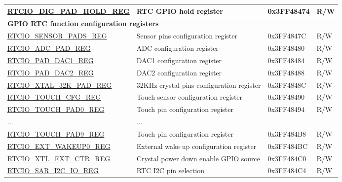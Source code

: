 \begin{longtable}{ | p{6.2cm} | p{6.8cm} | p{1.9cm} | p{1.1cm} | }
\hyperref[regdesc:RTCIODIGPADHOLDREG]{RTCIO\_DIG\_PAD\_HOLD\_REG} & RTC GPIO hold register & 0x3FF48474 & R/W \\ \hline
\multicolumn{4}{|l|}{\textbf{GPIO RTC function configuration registers}} \\ \hline
\hyperref[regdesc:RTCIOSENSORPADSREG]{RTCIO\_SENSOR\_PADS\_REG} & Sensor pins configuration register & 0x3FF4847C & R/W \\ \hline
\hyperref[regdesc:RTCIOADCPADREG]{RTCIO\_ADC\_PAD\_REG} & ADC configuration register & 0x3FF48480 & R/W \\ \hline
\hyperref[regdesc:RTCIOPADDAC1REG]{RTCIO\_PAD\_DAC1\_REG} & DAC1 configuration register & 0x3FF48484 &R/W \\ \hline
\hyperref[regdesc:RTCIOPADDAC2REG]{RTCIO\_PAD\_DAC2\_REG} & DAC2 configuration register & 0x3FF48488 & R/W \\ \hline
\hyperref[regdesc:RTCIOXTAL32KPADREG]{RTCIO\_XTAL\_32K\_PAD\_REG} & 32KHz crystal pins configuration register & 0x3FF4848C & R/W \\ \hline
\hyperref[regdesc:RTCIOTOUCHCFGREG]{RTCIO\_TOUCH\_CFG\_REG} & Touch sensor configuration register & 0x3FF48490 & R/W \\ \hline
\hyperref[regdesc:RTCIOTOUCHPADnREG]{RTCIO\_TOUCH\_PAD0\_REG} & Touch pin configuration register & 0x3FF48494 & R/W \\ \hline
... & ... & & \\ \hline
\hyperref[regdesc:RTCIOTOUCHPADnREG]{RTCIO\_TOUCH\_PAD9\_REG} & Touch pin configuration register & 0x3FF484B8 & R/W \\ \hline
\hyperref[regdesc:RTCIOEXTWAKEUP0REG]{RTCIO\_EXT\_WAKEUP0\_REG} & External wake up configuration register & 0x3FF484BC & R/W \\ \hline
\hyperref[regdesc:RTCIOXTLEXTCTRREG]{RTCIO\_XTL\_EXT\_CTR\_REG} & Crystal power down enable GPIO source & 0x3FF484C0 & R/W \\ \hline
\hyperref[regdesc:RTCIOSARI2CIOREG]{RTCIO\_SAR\_I2C\_IO\_REG} & RTC I2C pin selection & 0x3FF484C4 & R/W\\ \hline
\end{longtable}
